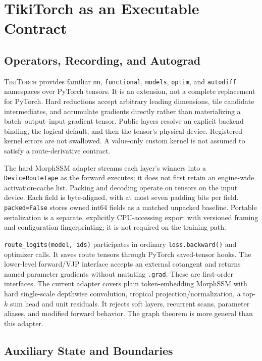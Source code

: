 \documentclass{article}
\theoremstyle{plain}
\theoremstyle{definition}
\theoremstyle{remark}
\newcommand{\ttorch}{\textsc{TikiTorch}}
\newcommand{\code}[1]{\texttt{#1}}
\begin{document}
\section{TikiTorch as an Executable Contract}
\label{sec:implementation}

\subsection{Operators, Recording, and Autograd}

\ttorch{} provides familiar \code{nn}, \code{functional}, \code{models},
\code{optim}, and \code{autodiff} namespaces over PyTorch tensors. It is an
extension, not a complete replacement for PyTorch. Hard reductions accept
arbitrary leading dimensions, tile candidate intermediates, and accumulate
gradients directly rather than materializing a batch--output--input gradient
tensor. Public layers resolve an explicit backend binding, the logical
default, and then the tensor's physical device. Registered kernel errors are
not swallowed. A value-only custom kernel is not assumed to satisfy a
route-derivative contract.

The hard MorphSSM adapter streams each layer's winners into a
\code{DeviceRouteTape} as the forward executes; it does not first retain an
engine-wide activation-cache list. Packing and decoding operate on tensors
on the input device. Each field is byte-aligned, with at most seven padding
bits per field. \code{packed=False} stores owned int64 fields as a matched
unpacked baseline. Portable serialization is a separate, explicitly
CPU-accessing export with versioned framing and configuration fingerprinting;
it is not required on the training path.

\code{route\_logits(model, ids)} participates in ordinary
\code{loss.backward()} and optimizer calls. It saves route tensors through
PyTorch saved-tensor hooks. The lower-level forward/VJP interface accepts an
external cotangent and returns named parameter gradients without mutating
\code{.grad}. These are first-order interfaces. The current adapter covers
plain token-embedding MorphSSM with hard single-scale depthwise convolution,
tropical projection/normalization, a top-$k$ sum head and unit residuals.
It rejects soft layers, recurrent scans, parameter aliases, and modified
forward behavior. The graph theorem is more general than this adapter.

\subsection{Auxiliary State and Boundaries}
\end{document}

